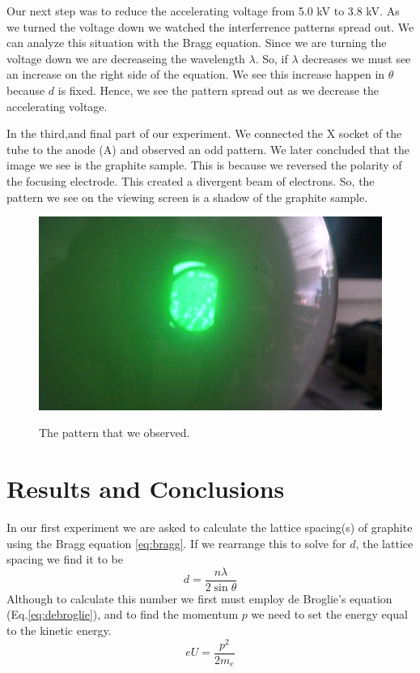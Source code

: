 \documentclass[12pt letterpaper]{article}
\begin{document}
Our next step was to reduce the accelerating voltage from 5.0 kV to 3.8 kV. As we turned the voltage down we watched the interferrence patterns spread out. We can analyze this situation with the Bragg equation. Since we are turning the voltage down we are decreaseing the wavelength $\lambda$. So, if $\lambda$ decreases we must see an increase on the right side of the equation. We see this increase happen in $\theta$ because $d$ is fixed. Hence, we see the pattern spread out as we decrease the accelerating voltage. 

In the third,and final part of our experiment. We connected the X socket of the tube to the anode (A) and observed an odd pattern. We later concluded that the image we see is the graphite sample. This is because we reversed the polarity of the focusing electrode. This created a divergent beam of electrons. So, the pattern we see on the viewing screen is a shadow of the graphite sample.
  

\begin{figure}[H]
  \caption{The pattern that we observed.}
  \centering
    \includegraphics[width=.75\textwidth]{graphite_sample.jpg}
    \label{fig:graphite_sample}
\end{figure}


\section*{Results and Conclusions}

In our first experiment we are asked to calculate the lattice spacing(s) of graphite using the Bragg equation \ref{eq:bragg}. If we rearrange this to solve for $d$, the lattice spacing we find it to be 
$$ 
d = \frac{n \lambda}{2 \sin \theta}
$$
Although to calculate this number we first must employ de Broglie's equation (Eq.\ref{eq:debroglie}), and to find the momentum $p$ we need to set the energy equal to the kinetic energy. 
\begin{equation}
\label{eq:energy}
e U = \frac{p^2}{2m_e}
\end{equation} 
\end{document}
